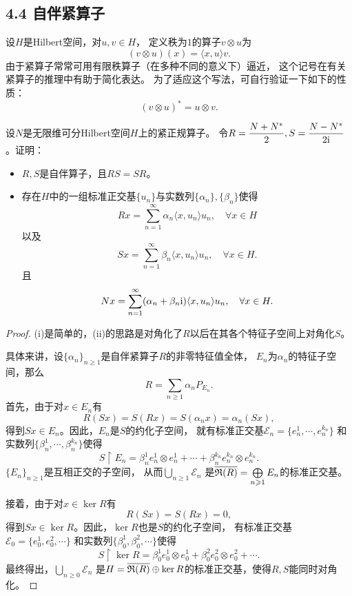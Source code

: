 \subsection{4.4 自伴紧算子}
\begin{definition*}
    设$H$是Hilbert空间，对$u,v \in H$，
    定义秩为$1$的算子$v \otimes u$为
    \[(v \otimes u)(x)=\langle x,u \rangle v.\]
    由于紧算子常常可用有限秩算子（在多种不同的意义下）逼近，
    这个记号在有关紧算子的推理中有助于简化表达。
    为了适应这个写法，可自行验证一下如下的性质：
    \[(v \otimes u)^*=u \otimes v.\]
\end{definition*}
\begin{1}
    设$N$是无限维可分Hilbert空间$H$上的紧正规算子。
    令$R=\dfrac{N+N^*}{2},S=\dfrac{N-N^*}{2{\rm i}}$。证明：
    \begin{itemize}
    \item[(i)] $R,S$是自伴算子，且$RS=SR$。
    \item[(ii)] 存在$H$中的一组标准正交基$\{u_n\}$与实数列$\{\alpha_n\},\{\beta_n\}$使得
    \[Rx=\sum_{n=1}^{\infty}\alpha_n\langle x,u_n \rangle u_n,\quad\forall x \in H\]
    以及
    \[Sx=\sum_{n=1}^{\infty}\beta_n\langle x,u_n \rangle u_n,\quad\forall x \in H.\]
    且
    \[Nx=\sum_{n=1}^{\infty}(\alpha_n+\beta_n{\rm i)}\langle x,u_n \rangle u_n,\quad\forall x \in H.\]
    \end{itemize}
\end{1}
\begin{proof}
    (i)是简单的，(ii)的思路是对角化了$R$以后在其各个特征子空间上对角化$S$。

    具体来讲，设$\{\alpha_n\}_{n\geqslant1}$是自伴紧算子$R$的非零特征值全体，
    $E_n$为$\alpha_n$的特征子空间，那么
    \[R=\sum_{n\geqslant1}\alpha_nP_{E_n}.\]
    首先，由于对$x \in E_n$有
    \[R(Sx)=S(Rx)=S(\alpha_nx)=\alpha_n(Sx),\]
    得到$Sx \in E_n$。因此，$E_n$是$S$的约化子空间，
    就有标准正交基$\mathcal{E}_n=\{e_n^1,\cdots,e_n^{k_n}\}$
    和实数列$\{\beta_n^1,\cdots,\beta_n^{k_n}\}$使得
    \[S \upharpoonright E_n=\beta_n^1e_n^1 \otimes e_n^1
    +\cdots+\beta_n^{k_n}e_n^{k_n} \otimes e_n^{k_n}.\]
    $\{E_n\}_{n\geqslant1}$是互相正交的子空间，
    从而$\bigcup\limits_{n\geqslant1}\mathcal{E}_n$
    是$\overline{\mathfrak{R}(R)}=\bigoplus\limits_{n\geqslant1}E_n$的标准正交基。

    接着，由于对$x\in\ker R$有
    \[R(Sx)=S(Rx)=0,\]
    得到$Sx\in\ker R$。因此，$\ker R$也是$S$的约化子空间，
    有标准正交基$\mathcal{E}_0=\{e_0^1,e_0^2,\cdots\}$
    和实数列$\{\beta_0^1,\beta_0^2,\cdots\}$使得
    \[S \upharpoonright \ker R=\beta_0^1e_0^1 \otimes e_0^1
    +\beta_0^2e_0^2 \otimes e_0^2+\cdots.\]
    最终得出，$\bigcup\limits_{n\geqslant0}\mathcal{E}_n$
    是$H=\overline{\mathfrak{R}(R)}\oplus\ker R$的标准正交基，使得$R,S$能同时对角化。
\end{proof}

